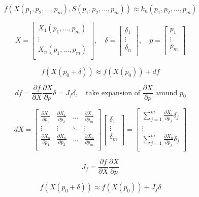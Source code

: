 \documentclass{article}
\begin{document}
\begin{multicols}{2}
\[
f(X(p_1, p_2, \ldots, p_m), S(p_1, p_2, \ldots, p_m)) \approx k_n (p_1, p_2, \ldots, p_m)
\]

\[
X = \begin{bmatrix}
X_1(p_1, \ldots, p_m) \\
\vdots \\
X_n(p_1, \ldots, p_m) \\
\end{bmatrix},
\quad
\delta = \begin{bmatrix}
\delta_1 \\
\vdots \\
\delta_n \\
\end{bmatrix},
\quad
p = \begin{bmatrix}
p_1 \\
\vdots \\
p_m \\
\end{bmatrix}
\]

\[
f(X(p_0 + \delta)) \approx f(X(p_0)) + df
\]

\[
df = \frac{\partial f}{\partial X} \frac{\partial X}{\partial p} \delta = J_f \delta,
\quad
\text{take expansion of } \frac{\partial X}{\partial p} \text{ around } p_0
\]

\[
dX = \begin{bmatrix}
\frac{\partial X_1}{\partial p_1} & \frac{\partial X_1}{\partial p_2} & \ldots & \frac{\partial X_1}{\partial p_m} \\
\vdots & \vdots & \ddots & \vdots \\
\frac{\partial X_n}{\partial p_1} & \frac{\partial X_n}{\partial p_2} & \ldots & \frac{\partial X_n}{\partial p_m} \\
\end{bmatrix}
\begin{bmatrix}
\delta_1 \\
\vdots \\
\delta_m \\
\end{bmatrix}
= \begin{bmatrix}
\sum \limits_{j=1}^{m} \frac{\partial X_1}{\partial p_j} \delta_j \\
\vdots \\
\sum \limits_{j=1}^{m} \frac{\partial X_n}{\partial p_j} \delta_j \\
\end{bmatrix}
\]


\[
J_f = \frac{\partial f}{\partial X} \frac{\partial X}{\partial p}
\]

\[
f(X(p_0 + \delta)) \approx f(X(p_0)) + J_f \delta
\]



\end{multicols}
\end{document}
